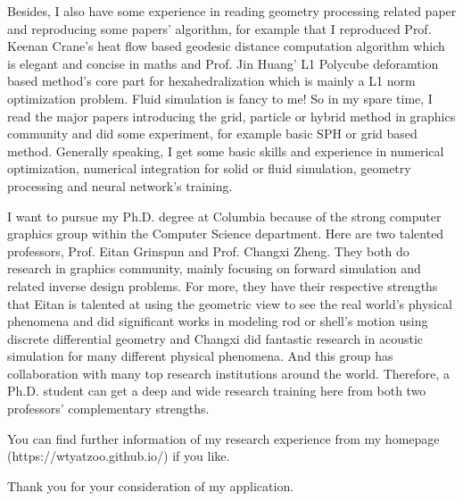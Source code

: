 \documentclass[a4paper,12pt]{article}
\begin{document}
Besides, I also have some experience in reading geometry processing related paper and reproducing some papers' algorithm, for example that I reproduced Prof. Keenan Crane's heat flow based geodesic distance computation algorithm which is elegant and concise in maths and Prof. Jin Huang' L1 Polycube deforamtion based method's core part for hexahedralization which is mainly a L1 norm optimization problem. Fluid simulation is fancy to me! So in my spare time, I read the major papers introducing the grid, particle or hybrid method in graphics community and did some experiment, for example basic SPH or grid based method. Generally speaking, I get some basic skills and experience in numerical optimization, numerical integration for solid or fluid simulation, geometry processing and neural network's training.\vspace{1.2ex}

I want to pursue my Ph.D. degree at Columbia because of the strong computer graphics group within the Computer Science department. Here are two talented professors, Prof. Eitan Grinspun and Prof. Changxi Zheng. They both do research in graphics community, mainly focusing on forward simulation and related inverse design problems. For more, they have their respective strengths that Eitan is talented at using the geometric view to see the real world's physical phenomena and did significant works in modeling rod or shell's motion using discrete differential geometry and Changxi did fantastic research in acoustic simulation for many different physical phenomena. And this group has collaboration with many top research institutions around the world. Therefore, a Ph.D. student can get a deep and wide research training here from both two professors' complementary strengths.\vspace{1.2ex} 

You can find further information of my research experience from my homepage\\(https://wtyatzoo.github.io/) if you like.\vspace{1.2ex}

Thank you for your consideration of my application.

\vspace{1.2ex}
\end{document}
